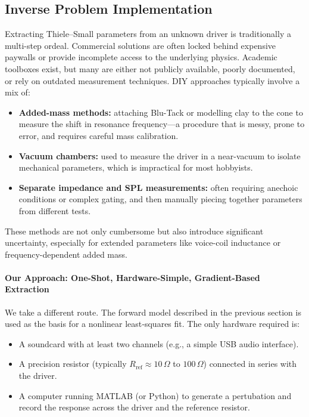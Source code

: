 \subsection{Inverse Problem Implementation}

Extracting Thiele–Small parameters from an unknown driver is traditionally a multi-step ordeal. Commercial solutions are often locked behind expensive paywalls or provide incomplete access to the underlying physics. Academic toolboxes exist, but many are either not publicly available, poorly documented, or rely on outdated measurement techniques. DIY approaches typically involve a mix of:

\begin{itemize}
  \item \textbf{Added-mass methods:} attaching Blu-Tack or modelling clay to the cone to measure the shift in resonance frequency—a procedure that is messy, prone to error, and requires careful mass calibration.
  \item \textbf{Vacuum chambers:} used to measure the driver in a near-vacuum to isolate mechanical parameters, which is impractical for most hobbyists.
  \item \textbf{Separate impedance and SPL measurements:} often requiring anechoic conditions or complex gating, and then manually piecing together parameters from different tests.
\end{itemize}

These methods are not only cumbersome but also introduce significant uncertainty, especially for extended parameters like voice-coil inductance or frequency-dependent added mass.

\paragraph{Our Approach: One-Shot, Hardware-Simple, Gradient-Based Extraction}

We take a different route. The forward model described in the previous section is used as the basis for a nonlinear least‑squares fit. The only hardware required is:

\begin{itemize}
  \item A soundcard with at least two channels (e.g., a simple USB audio interface).
  \item A precision resistor (typically $R_{\text{ref}} \approx 10\,\Omega$ to $100\,\Omega$) connected in series with the driver.
  \item A computer running MATLAB (or Python) to generate a pertubation and record the response across the driver and the reference resistor.
\end{itemize}

